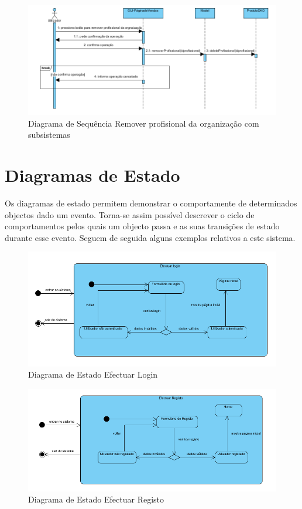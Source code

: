\documentclass[12pt,a4paper]{article}
\begin{document}
\begin{figure}[h!]
\centering
\includegraphics[scale=0.7]{sequencia/est_removerprofissional}
\caption{Diagrama de Sequência Remover profisional da organização com subsistemas} 
\end{figure}  

\clearpage

\section{Diagramas de Estado}
Os diagramas de estado permitem demonstrar o comportamente de determinados objectos dado um evento. Torna-se assim possível descrever o ciclo de comportamentos pelos quais um objecto passa e as suas transições de estado durante esse evento. Seguem de seguida alguns exemplos relativos a este sistema.\\

\begin{figure}[h!]
\centering
\includegraphics[scale=0.7]{estado/login}
\caption{Diagrama de Estado Efectuar Login} 
\end{figure} 

\begin{figure}[h!]
\centering
\includegraphics[scale=0.7]{estado/registo}
\caption{Diagrama de Estado Efectuar Registo} 
\end{figure} 
\end{document}
